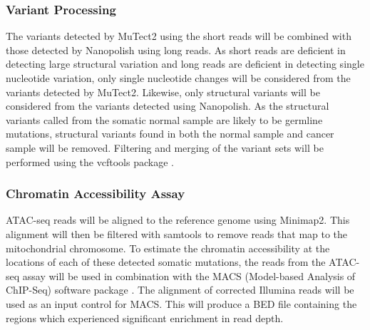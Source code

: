 \subsubsection{Variant Processing}
The variants detected by MuTect2 using the short reads will be combined with those detected by Nanopolish using long reads. As short reads are deficient in detecting large structural variation and long reads are deficient in detecting single nucleotide variation, only single nucleotide changes will be considered from the variants detected by MuTect2. Likewise, only structural variants will be considered from the variants detected using Nanopolish.
As the structural variants called from the somatic normal sample are likely to be germline mutations, structural variants found in both the normal sample and cancer sample will be removed.
Filtering and merging of the variant sets will be performed using the vcftools package \parencite{danecek_variant_2011}.

\subsubsection{Chromatin Accessibility Assay}
ATAC-seq reads will be aligned to the reference genome using Minimap2.
This alignment will then be filtered with samtools \parencite{li_sequence_2009} to remove reads that map to the mitochondrial chromosome.
To estimate the chromatin accessibility at the locations of each of these detected somatic mutations, the reads from the ATAC-seq assay will be used in combination with the MACS (Model-based Analysis of ChIP-Seq) software package \parencite{zhang_model-based_2008}.
The alignment of corrected Illumina reads will be used as an input control for MACS.
This will produce a BED file containing the regions which experienced significant enrichment in read depth.


